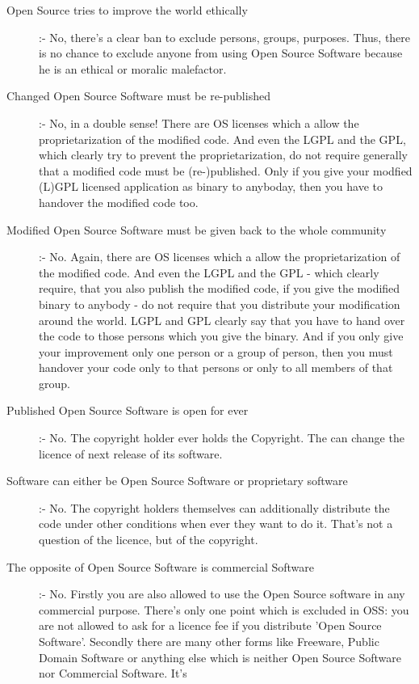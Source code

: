 \begin{description}
  \item[Open Source tries to improve the world ethically] :- No, there's a clear
  ban to exclude persons, groups, purposes. Thus, there is no chance to exclude
  anyone from using Open Source Software because he is an ethical or moralic
  malefactor.
  \item[Changed Open Source Software must be re-published] :- No, in a double
  sense! There are OS licenses which a allow the proprietarization of the
  modified code. And even the LGPL and the GPL, which clearly try to prevent
  the proprietarization, do not require generally that a modified code must be
  (re-)published. Only if you give your modfied (L)GPL licensed application as
  binary to anyboday, then you have to handover the modified code too.
  \item[Modified Open Source Software must be given back to the whole community]
  :- No. Again, there are OS licenses which a allow the proprietarization of the
  modified code. And even the LGPL and the GPL - which clearly require, that you
  also publish the modified code, if you give the modified binary to anybody -
  do not require that you distribute your modification around the world. LGPL and
  GPL clearly say that you have to hand over the code to those persons which you
  give the binary. And if you only give your improvement only one person or a
  group of person, then you must handover your code only to that persons or
  only to all members of that group.
  \item[Published Open Source Software is open for ever] :- No. The copyright
  holder ever holds the Copyright. The can change the licence of next release of
  its software.
  \item[Software can either be Open Source Software or proprietary software] :-
  No. The copyright holders themselves can additionally distribute the code
  under other conditions when ever they want to do it. That's not a question of
  the licence, but of the copyright.  
  \item[The opposite of Open Source Software is commercial Software] :- No.
  Firstly you are also allowed to use the Open Source software in any commercial
  purpose. There's only one point which is excluded in OSS: you are not allowed
  to ask for a licence fee if you distribute 'Open Source Software'. Secondly
  there are many other forms like Freeware, Public Domain Software or anything
  else which is neither Open Source Software nor Commercial Software. It's

\end{description}
